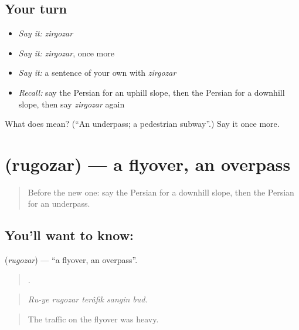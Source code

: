 \subsection*{Your turn}
\begin{itemize}
\raggedright
  \item \emph{Say it:} \emph{zirgozar}
  \item \emph{Say it:} \emph{zirgozar}, once more
  \item \emph{Say it:} a sentence of your own with \emph{zirgozar}
  \item \emph{Recall:} say the Persian for an uphill slope, then the Persian for a downhill slope, then say \emph{zirgozar} again
\end{itemize}

\begin{tcolorbox}[breakable,colback=teal!4,colframe=teal!35!black,title={Before you move on}]
What does  mean? (\textquotedblleft{}An underpass; a pedestrian subway\textquotedblright{}.) Say it once more.
\end{tcolorbox}
\section[\texorpdfstring{\fa{روگذر} (rugozar)}{روگذر (rugozar)}]{ (rugozar) — a flyover, an overpass}

\label{lesson:FA-C448-rugozar}



\begin{quote}
Before the new one: say the Persian for a downhill slope, then the Persian for an underpass.
\end{quote}

\subsection*{You'll want to know: }
\textbf{} (\emph{rugozar}) — \textquotedblleft{}a flyover, an overpass\textquotedblright{}.

\begin{quote}
    .
\end{quote}

\begin{quote}
\emph{Ru-ye rugozar terâfik sangin bud.}
\end{quote}

\begin{quote}
The traffic on the flyover was heavy.
\end{quote}

